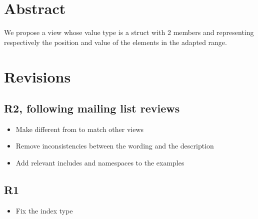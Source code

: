 \documentclass{wg21}
\title{\tcode{views::enumerate}}
\author{Corentin Jabot}{corentin.jabot@gmail.com}
\begin{document}
\maketitle


\section{Abstract}

We propose a view  whose value type is a struct with 2 members  and 
representing respectively the position and value of the elements in the adapted range. 

\section{Revisions}

\subsection{R2, following mailing list reviews}
\begin{itemize}
    \item Make  different from   to match other views
    \item Remove inconsistencies between the wording and the description
    \item Add relevant includes and namespaces to the examples
\end{itemize}


\subsection{R1}
\begin{itemize}
\item Fix the index type
\end{itemize}
\end{document}
